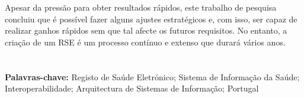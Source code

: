 Apesar da pressão para obter resultados rápidos, este trabalho de pesquisa concluiu que é possível fazer alguns ajustes estratégicos e, com isso, ser capaz de realizar ganhos rápidos sem que tal afecte os futuros requisitos. No entanto, a criação de um RSE é um processo contínuo e extenso que durará vários anos.




\section*{}
\textbf{Palavras-chave:} Registo de Saúde Eletrónico; Sistema de Informação da Saúde; Interoperabilidade; Arquitectura de Sistemas de Informação; Portugal

%
